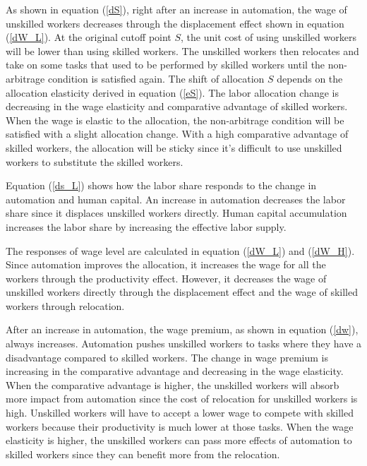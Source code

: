 \documentclass[12pt]{article}
\begin{document}
As shown in equation (\ref{dS}), right after an increase in automation, the wage of unskilled workers decreases through the displacement effect shown in equation  (\ref{dW_L}). At the original cutoff point $S$, the unit cost of using unskilled workers will be lower than using skilled workers. The unskilled workers then relocates and take on some tasks that used to be performed by skilled workers until the non-arbitrage condition is satisfied again. The shift of allocation $S$ depends on the allocation elasticity derived in equation (\ref{eS}). The labor allocation change is decreasing in the wage elasticity and comparative advantage of skilled workers. When the wage is elastic to the allocation, the non-arbitrage condition will be satisfied with a slight allocation change. With a high comparative advantage of skilled workers, the allocation will be sticky since it's difficult to use unskilled workers to substitute the skilled workers. 

Equation (\ref{ds_L}) shows how the labor share responds to the change in automation and human capital. An increase in automation decreases the labor share since it displaces unskilled workers directly. Human capital accumulation increases the labor share by increasing the effective labor supply. 

The responses of wage level are calculated in equation (\ref{dW_L}) and (\ref{dW_H}). Since automation improves the allocation, it increases the wage for all the workers through the productivity effect. However, it decreases the wage of unskilled workers directly through the displacement effect and the wage of skilled workers through relocation. 

After an increase in automation, the wage premium, as shown in equation (\ref{dw}), always increases. Automation pushes unskilled workers to tasks where they have a disadvantage compared to skilled workers. The change in wage premium is increasing in the comparative advantage and decreasing in the wage elasticity. When the comparative advantage is higher, the unskilled workers will absorb more impact from automation since the cost of relocation for unskilled workers is high. Unskilled workers will have to accept a lower wage to compete with skilled workers because their productivity is much lower at those tasks. When the wage elasticity is higher, the unskilled workers can pass more effects of automation to skilled workers since they can benefit more from the relocation.
\end{document}
